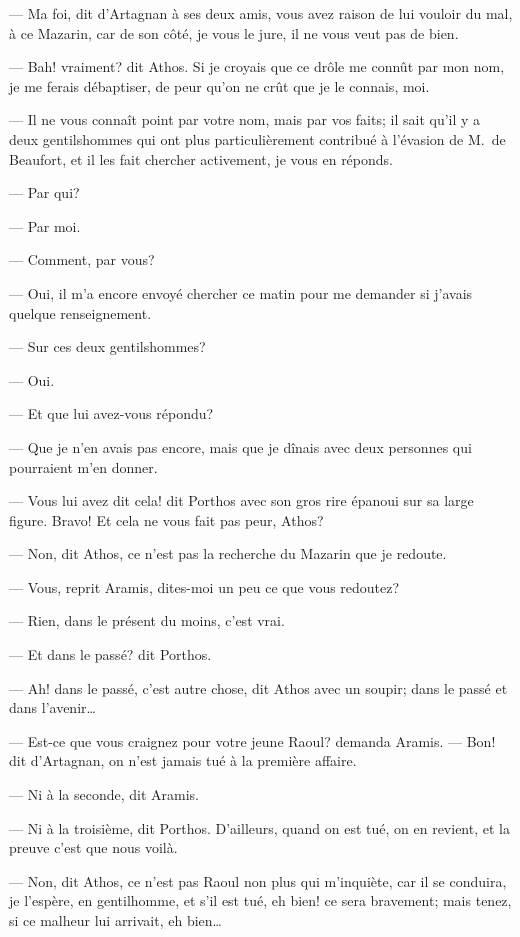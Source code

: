 — Ma foi, dit d'Artagnan à ses deux amis, vous avez raison de lui vouloir du mal, à ce Mazarin, car de son côté, je vous le jure, il ne vous veut pas de bien.

— Bah! vraiment? dit Athos. Si je croyais que ce drôle me connût par mon nom, je me ferais débaptiser, de peur qu'on ne crût que je le connais, moi.

— Il ne vous connaît point par votre nom, mais par vos faits; il sait qu'il y a deux gentilshommes qui ont plus particulièrement contribué à l'évasion de M.~de Beaufort, et il les fait chercher activement, je vous en réponds.

— Par qui?

— Par moi.

— Comment, par vous?

— Oui, il m'a encore envoyé chercher ce matin pour me demander si j'avais quelque renseignement.

— Sur ces deux gentilshommes?

— Oui.

— Et que lui avez-vous répondu?

— Que je n'en avais pas encore, mais que je dînais avec deux personnes qui pourraient m'en donner.

— Vous lui avez dit cela! dit Porthos avec son gros rire épanoui sur sa large figure. Bravo! Et cela ne vous fait pas peur, Athos?

— Non, dit Athos, ce n'est pas la recherche du Mazarin que je redoute.

— Vous, reprit Aramis, dites-moi un peu ce que vous redoutez?

— Rien, dans le présent du moins, c'est vrai.

— Et dans le passé? dit Porthos.

— Ah! dans le passé, c'est autre chose, dit Athos avec un soupir; dans le passé et dans l'avenir\dots

— Est-ce que vous craignez pour votre jeune Raoul? demanda Aramis.
— Bon! dit d'Artagnan, on n'est jamais tué à la première affaire.

— Ni à la seconde, dit Aramis.

— Ni à la troisième, dit Porthos. D'ailleurs, quand on est tué, on en revient, et la preuve c'est que nous voilà.

— Non, dit Athos, ce n'est pas Raoul non plus qui m'inquiète, car il se conduira, je l'espère, en gentilhomme, et s'il est tué, eh bien! ce sera bravement; mais tenez, si ce malheur lui arrivait, eh bien\dots

